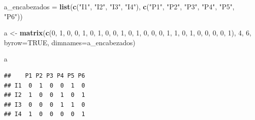 \documentclass[]{article}
\newenvironment{Shaded}{\begin{snugshade}}{\end{snugshade}}
\newcommand{\DataTypeTok}[1]{\textcolor[rgb]{0.13,0.29,0.53}{#1}}
\newcommand{\DecValTok}[1]{\textcolor[rgb]{0.00,0.00,0.81}{#1}}
\newcommand{\KeywordTok}[1]{\textcolor[rgb]{0.13,0.29,0.53}{\textbf{#1}}}
\newcommand{\NormalTok}[1]{#1}
\newcommand{\OtherTok}[1]{\textcolor[rgb]{0.56,0.35,0.01}{#1}}
\newcommand{\StringTok}[1]{\textcolor[rgb]{0.31,0.60,0.02}{#1}}
\begin{document}
\begin{Shaded}
\begin{Highlighting}[]
\NormalTok{a_encabezados =}\StringTok{ }\KeywordTok{list}\NormalTok{(}\KeywordTok{c}\NormalTok{(}\StringTok{"I1"}\NormalTok{, }\StringTok{"I2"}\NormalTok{, }\StringTok{"I3"}\NormalTok{, }\StringTok{"I4"}\NormalTok{), }\KeywordTok{c}\NormalTok{(}\StringTok{"P1"}\NormalTok{, }\StringTok{"P2"}\NormalTok{, }\StringTok{"P3"}\NormalTok{, }\StringTok{"P4"}\NormalTok{, }\StringTok{"P5"}\NormalTok{, }\StringTok{"P6"}\NormalTok{))}

\NormalTok{a <-}\StringTok{ }\KeywordTok{matrix}\NormalTok{(}\KeywordTok{c}\NormalTok{(}\DecValTok{0}\NormalTok{, }\DecValTok{1}\NormalTok{, }\DecValTok{0}\NormalTok{, }\DecValTok{0}\NormalTok{, }\DecValTok{1}\NormalTok{, }\DecValTok{0}\NormalTok{,}
              \DecValTok{1}\NormalTok{, }\DecValTok{0}\NormalTok{, }\DecValTok{0}\NormalTok{, }\DecValTok{1}\NormalTok{, }\DecValTok{0}\NormalTok{, }\DecValTok{1}\NormalTok{,}
              \DecValTok{0}\NormalTok{, }\DecValTok{0}\NormalTok{, }\DecValTok{0}\NormalTok{, }\DecValTok{1}\NormalTok{, }\DecValTok{1}\NormalTok{, }\DecValTok{0}\NormalTok{,}
              \DecValTok{1}\NormalTok{, }\DecValTok{0}\NormalTok{, }\DecValTok{0}\NormalTok{, }\DecValTok{0}\NormalTok{, }\DecValTok{0}\NormalTok{, }\DecValTok{1}\NormalTok{),}
              \DecValTok{4}\NormalTok{, }\DecValTok{6}\NormalTok{, }\DataTypeTok{byrow=}\OtherTok{TRUE}\NormalTok{, }\DataTypeTok{dimnames=}\NormalTok{a_encabezados)}

\NormalTok{a}
\end{Highlighting}
\end{Shaded}

\begin{verbatim}
##    P1 P2 P3 P4 P5 P6
## I1  0  1  0  0  1  0
## I2  1  0  0  1  0  1
## I3  0  0  0  1  1  0
## I4  1  0  0  0  0  1
\end{verbatim}
\end{document}
